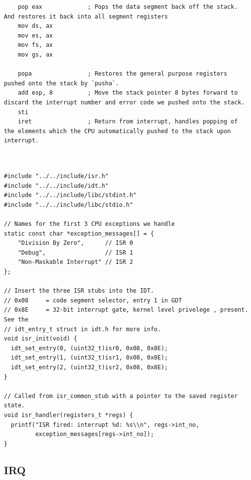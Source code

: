 \documentclass[../main.tex]{subfiles}
\begin{document}
\begin{verbatim}
    pop eax             ; Pops the data segment back off the stack. And restores it back into all segment registers
    mov ds, ax           
    mov es, ax
    mov fs, ax
    mov gs, ax

    popa                ; Restores the general purpose registers pushed onto the stack by `pusha`.
    add esp, 8          ; Move the stack pointer 8 bytes forward to discard the interrupt number and error code we pushed onto the stack. 
    sti
    iret                ; Return from interrupt, handles popping of the elements which the CPU automatically pushed to the stack upon interrupt.



\end{verbatim}


\label{lst:isr_c}
\begin{verbatim}
#include "../../include/isr.h"
#include "../../include/idt.h"
#include "../../include/libc/stdint.h"
#include "../../include/libc/stdio.h"

// Names for the first 3 CPU exceptions we handle
static const char *exception_messages[] = {
    "Division By Zero",      // ISR 0
    "Debug",                 // ISR 1
    "Non-Maskable Interrupt" // ISR 2
};

// Insert the three ISR stubs into the IDT.
// 0x08     = code segment selector, entry 1 in GDT
// 0x8E     = 32-bit interrupt gate, kernel level privelege , present. See the
// idt_entry_t struct in idt.h for more info.
void isr_init(void) {
  idt_set_entry(0, (uint32_t)isr0, 0x08, 0x8E);
  idt_set_entry(1, (uint32_t)isr1, 0x08, 0x8E);
  idt_set_entry(2, (uint32_t)isr2, 0x08, 0x8E);
}

// Called from isr_common_stub with a pointer to the saved register state.
void isr_handler(registers_t *regs) {
  printf("ISR fired: interrupt %d: %s\\n", regs->int_no,
         exception_messages[regs->int_no]);
}

\end{verbatim}


\subsection{IRQ}
\label{apx:irq}
\end{document}
